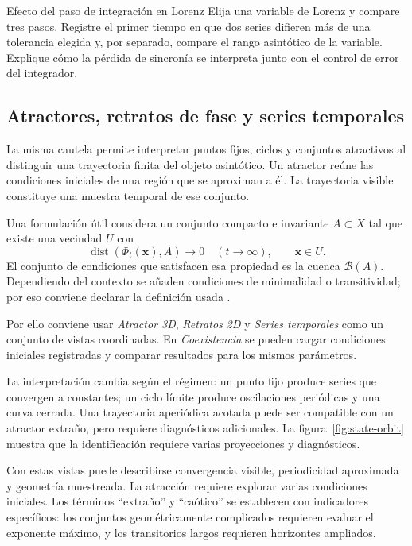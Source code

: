 \documentclass[11pt,a4paper]{article}
\newcommand{\dist}{\operatorname{dist}}
\newcommand{\gui}[1]{\textsf{\emph{#1}}}
\begin{document}
\begin{activitybox}{Efecto del paso de integración en Lorenz}
Elija una variable de Lorenz y compare tres pasos. Registre el primer tiempo en que
dos series difieren más de una tolerancia elegida y, por separado, compare el rango
asintótico de la variable. Explique cómo la pérdida de sincronía se interpreta junto
con el control de error del integrador.
\end{activitybox}

\subsection{Atractores, retratos de fase y series temporales}

La misma cautela permite interpretar puntos fijos, ciclos y conjuntos atractivos al
distinguir una trayectoria finita del objeto asintótico. Un atractor reúne las
condiciones iniciales de una región que se aproximan a él. La trayectoria visible
constituye una muestra temporal de ese conjunto.

Una formulación útil considera un conjunto compacto e invariante $A\subset X$ tal
que existe una vecindad $U$ con
\[
  \dist(\Phi_t(\mathbf{x}),A)\longrightarrow0\quad (t\to\infty),
  \qquad \mathbf{x}\in U.
\]
El conjunto de condiciones que satisfacen esa propiedad es la cuenca
$\mathcal B(A)$. Dependiendo del contexto se añaden condiciones de minimalidad o
transitividad; por eso conviene declarar la definición usada \cite{strogatz2024}.

Por ello conviene usar \gui{Atractor 3D}, \gui{Retratos 2D} y
\gui{Series temporales} como un conjunto de
vistas coordinadas. En \gui{Coexistencia} se pueden cargar condiciones iniciales
registradas y comparar resultados para los mismos parámetros.

La interpretación cambia según el régimen: un punto fijo produce series que convergen
a constantes; un ciclo límite produce
oscilaciones periódicas y una curva cerrada. Una trayectoria aperiódica acotada puede
ser compatible con un atractor extraño, pero requiere diagnósticos adicionales. La
figura~\ref{fig:state-orbit} muestra que la identificación requiere varias proyecciones y diagnósticos.

Con estas vistas puede describirse convergencia visible, periodicidad aproximada y
geometría muestreada.
La atracción requiere explorar varias condiciones iniciales. Los términos ``extraño'' y
``caótico'' se establecen con indicadores específicos: los conjuntos geométricamente
complicados requieren evaluar el exponente máximo, y los transitorios largos requieren horizontes ampliados.
\end{document}
